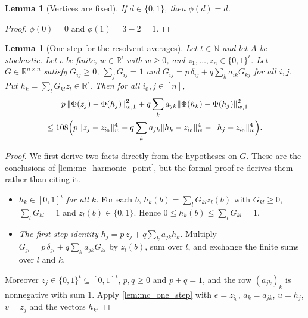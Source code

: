 \documentclass[11pt]{article}
\newtheorem{lemma}[theorem]{Lemma}
\theoremstyle{definition}
\theoremstyle{remark}
\newcommand{\R}{\mathbb{R}}
\newcommand{\N}{\mathbb{N}}
\newcommand{\wn}[1]{\lVert #1\rVert_{w,1}}
\newcommand{\hn}[1]{\lVert #1\rVert_{w}}
\begin{document}
\begin{lemma}[Vertices are fixed]\label{lem:mc_phi_vertex}
If $d\in\{0,1\}$, then $\phi(d)=d$.
\end{lemma}
\begin{proof}
$\phi(0)=0$ and $\phi(1)=3-2=1$.
\end{proof}

\begin{lemma}[One step for the resolvent averages]\label{lem:mc_cube_step}
Let $t\in\N$ and let $A$ be stochastic. Let $\iota$ be finite, $w\in\R^\iota$ with $w\ge0$, and $z_1,\dots,z_n\in\{0,1\}^\iota$. Let $G\in\R^{n\times n}$ satisfy $G_{ij}\ge0$, $\sum_jG_{ij}=1$ and $G_{ij}=p\,\delta_{ij}+q\sum_ka_{ik}G_{kj}$ for all $i,j$. Put $h_k=\sum_lG_{kl}z_l\in\R^\iota$. Then for all $i_0,j\in[n]$,
\begin{multline*}
p\,\wn{\Phi(z_j)-\Phi(h_j)}^2+q\sum_ka_{jk}\wn{\Phi(h_k)-\Phi(h_j)}^2\\
\le108\Bigl(p\,\hn{z_j-z_{i_0}}^4+q\sum_ka_{jk}\hn{h_k-z_{i_0}}^4-\hn{h_j-z_{i_0}}^4\Bigr).
\end{multline*}
\end{lemma}
\begin{proof}
We first derive two facts directly from the hypotheses on $G$. These are the conclusions of \cref{lem:mc_harmonic_point}, but the formal proof re-derives them rather than citing it.
\begin{itemize}
\item \emph{$h_k\in[0,1]^\iota$ for all $k$.} For each $b$, $h_k(b)=\sum_lG_{kl}z_l(b)$ with $G_{kl}\ge0$, $\sum_lG_{kl}=1$ and $z_l(b)\in\{0,1\}$. Hence $0\le h_k(b)\le\sum_lG_{kl}=1$.
\item \emph{The first-step identity $h_j=p\,z_j+q\sum_ka_{jk}h_k$.} Multiply $G_{jl}=p\,\delta_{jl}+q\sum_ka_{jk}G_{kl}$ by $z_l(b)$, sum over $l$, and exchange the finite sums over $l$ and $k$.
\end{itemize}
Moreover $z_j\in\{0,1\}^\iota\subseteq[0,1]^\iota$, $p,q\ge0$ and $p+q=1$, and the row $(a_{jk})_k$ is nonnegative with sum $1$. Apply \cref{lem:mc_one_step} with $e=z_{i_0}$, $a_k=a_{jk}$, $u=h_j$, $v=z_j$ and the vectors $h_k$.
\end{proof}
\end{document}
